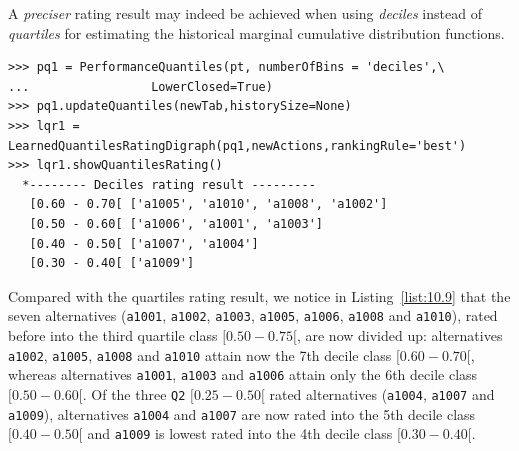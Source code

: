 A \emph{preciser} rating result may indeed be achieved when using \emph{deciles} instead of \emph{quartiles} for estimating the historical marginal cumulative distribution functions.
\begin{lstlisting}[caption={Absolute deciles rating result},label=list:10.9]
>>> pq1 = PerformanceQuantiles(pt, numberOfBins = 'deciles',\
...                 LowerClosed=True)
>>> pq1.updateQuantiles(newTab,historySize=None)
>>> lqr1 = LearnedQuantilesRatingDigraph(pq1,newActions,rankingRule='best')
>>> lqr1.showQuantilesRating()
  *-------- Deciles rating result ---------
   [0.60 - 0.70[ ['a1005', 'a1010', 'a1008', 'a1002']
   [0.50 - 0.60[ ['a1006', 'a1001', 'a1003']
   [0.40 - 0.50[ ['a1007', 'a1004']
   [0.30 - 0.40[ ['a1009']
\end{lstlisting}
Compared with the quartiles rating result, we notice in Listing~\ref{list:10.9} that the seven alternatives (\texttt{a1001}, \texttt{a1002}, \texttt{a1003}, \texttt{a1005}, \texttt{a1006}, \texttt{a1008} and \texttt{a1010}), rated before into the third quartile class $[0.50-0.75[$, are now divided up: alternatives \texttt{a1002}, \texttt{a1005}, \texttt{a1008} and \texttt{a1010} attain now the 7th decile class $[0.60-0.70[$, whereas alternatives \texttt{a1001}, \texttt{a1003} and \texttt{a1006} attain only the 6th decile class $[0.50-0.60[$. Of the three \texttt{Q2} $[0.25-0.50[$ rated alternatives (\texttt{a1004}, \texttt{a1007} and \texttt{a1009}), alternatives \texttt{a1004} and \texttt{a1007} are now rated into the 5th decile class $[0.40-0.50[$ and \texttt{a1009} is lowest rated into the 4th decile class $[0.30-0.40[$.

